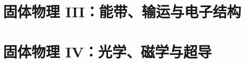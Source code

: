 \part{固体物理 III：能带、输运与电子结构}\label{part:solid3}\setpartcolor{\value{part}}
\newpage

\newpage

\newpage

\newpage

\newpage

\newpage

\newpage

\newpage

\newpage

\newpage

\newpage

\newpage

\newpage

\newpage

\newpage

\newpage

\newpage

\newpage

\newpage

\newpage

\newpage

\newpage

\newpage

\newpage

\newpage

\newpage

\newpage

\newpage

\newpage

\newpage

\newpage

\newpage

\newpage

\newpage

\newpage

\newpage
\part{固体物理 IV：光学、磁学与超导}\label{part:solid4}\setpartcolor{\value{part}}
\newpage

\newpage

\newpage

\newpage

\newpage

\newpage

\newpage

\newpage

\newpage

\newpage

\newpage

\newpage

\newpage

\newpage

\newpage

\newpage

\newpage

\newpage

\newpage

\newpage

\newpage

\newpage

\newpage
\newpage
\newpage
\newpage
\newpage
\newpage
\newpage
\newpage
\newpage
\newpage
\newpage
\newpage
\newpage
\newpage
\newpage
\newpage
\newpage
\newpage
\newpage
\newpage
\newpage
\newpage
\newpage
\newpage
\newpage
\newpage
\newpage
\newpage
\newpage
\newpage
\newpage
\newpage
\newpage
\newpage
\newpage
\newpage
\newpage
\newpage
\newpage
\newpage
\newpage
\newpage
\newpage
\newpage
\newpage
\newpage
\newpage
\newpage
\newpage
\newpage
\newpage
\newpage
\newpage
\newpage
\newpage
\newpage
\newpage
\newpage
\newpage
\newpage
\newpage
\newpage
\newpage
\newpage
\newpage
\newpage
\newpage
\newpage
\newpage
\newpage
\newpage
\newpage
\newpage
\newpage
\newpage
\newpage
\newpage
\newpage
\newpage
\newpage
\newpage
\newpage
\newpage
\newpage
\newpage
\newpage
\newpage
\newpage
\newpage
\newpage
\newpage
\newpage
\newpage


